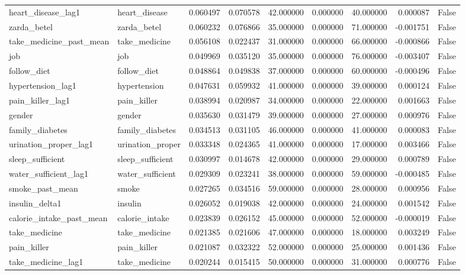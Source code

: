 \begin{longtable}{llrrrrrrr}
heart\_disease\_lag1 & heart\_disease & 0.060497 & 0.070578 & 42.000000 & 0.000000 & 40.000000 & 0.000087 & False \\
zarda\_betel & zarda\_betel & 0.060232 & 0.076866 & 35.000000 & 0.000000 & 71.000000 & -0.001751 & False \\
take\_medicine\_past\_mean & take\_medicine & 0.056108 & 0.022437 & 31.000000 & 0.000000 & 66.000000 & -0.000866 & False \\
job & job & 0.049969 & 0.035120 & 35.000000 & 0.000000 & 76.000000 & -0.003407 & False \\
follow\_diet & follow\_diet & 0.048864 & 0.049838 & 37.000000 & 0.000000 & 60.000000 & -0.000496 & False \\
hypertension\_lag1 & hypertension & 0.047631 & 0.059932 & 41.000000 & 0.000000 & 39.000000 & 0.000124 & False \\
pain\_killer\_lag1 & pain\_killer & 0.038994 & 0.020987 & 34.000000 & 0.000000 & 22.000000 & 0.001663 & False \\
gender & gender & 0.035630 & 0.031479 & 39.000000 & 0.000000 & 27.000000 & 0.000976 & False \\
family\_diabetes & family\_diabetes & 0.034513 & 0.031105 & 46.000000 & 0.000000 & 41.000000 & 0.000083 & False \\
urination\_proper\_lag1 & urination\_proper & 0.033348 & 0.024365 & 41.000000 & 0.000000 & 17.000000 & 0.003466 & False \\
sleep\_sufficient & sleep\_sufficient & 0.030997 & 0.014678 & 42.000000 & 0.000000 & 29.000000 & 0.000789 & False \\
water\_sufficient\_lag1 & water\_sufficient & 0.029309 & 0.023241 & 38.000000 & 0.000000 & 59.000000 & -0.000485 & False \\
smoke\_past\_mean & smoke & 0.027265 & 0.034516 & 59.000000 & 0.000000 & 28.000000 & 0.000956 & False \\
insulin\_delta1 & insulin & 0.026052 & 0.019038 & 42.000000 & 0.000000 & 24.000000 & 0.001542 & False \\
calorie\_intake\_past\_mean & calorie\_intake & 0.023839 & 0.026152 & 45.000000 & 0.000000 & 52.000000 & -0.000019 & False \\
take\_medicine & take\_medicine & 0.021385 & 0.021606 & 47.000000 & 0.000000 & 18.000000 & 0.003249 & False \\
pain\_killer & pain\_killer & 0.021087 & 0.032322 & 52.000000 & 0.000000 & 25.000000 & 0.001436 & False \\
take\_medicine\_lag1 & take\_medicine & 0.020244 & 0.015415 & 50.000000 & 0.000000 & 31.000000 & 0.000776 & False \\

\end{longtable}
